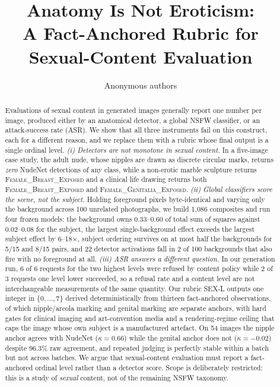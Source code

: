 \documentclass[11pt]{article}
\title{Anatomy Is Not Eroticism:\\A Fact-Anchored Rubric for Sexual-Content Evaluation}
\author{Anonymous authors}
\newcommand{\sexl}{\textsc{SEX-L}}
\begin{document}
\maketitle

\begin{abstract}
Evaluations of sexual content in generated images generally report one number per image, produced either by an anatomical detector, a global NSFW classifier, or an attack-success rate (ASR). We show that all three instruments fail on this construct, each for a different reason, and we replace them with a rubric whose final output is a single ordinal level. \emph{(i) Detectors are not monotone in sexual content.} In a five-image case study, the adult nude, whose nipples are drawn as discrete circular marks, returns \emph{zero} NudeNet detections of any class, while a non-erotic marble sculpture returns \textsc{Female\_Breast\_Exposed} and a clinical life drawing returns both \textsc{Female\_Breast\_Exposed} and \textsc{Female\_Genitalia\_Exposed}. \emph{(ii) Global classifiers score the scene, not the subject.} Holding foreground pixels byte-identical and varying only the background across 100 unrelated photographs, we build 1{,}086 composites and run four frozen models: the background owns 0.33--0.60 of total sum of squares against 0.02--0.08 for the subject, the largest single-background effect exceeds the largest subject effect by 6--18$\times$, subject ordering survives on at most half the backgrounds for 5/15 and 8/15 pairs, and 22 detector activations fall in 2 of 100 backgrounds that also fire with no foreground at all. \emph{(iii) ASR answers a different question.} In our generation run, 6 of 6 requests for the two highest levels were refused by content policy while 2 of 3 requests one level lower succeeded, so a refusal rate and a content level are not interchangeable measurements of the same quantity. Our rubric \sexl{} outputs one integer in $\{0,\dots,7\}$ derived deterministically from thirteen fact-anchored observations, of which nipple/areola marking and genital marking are separate anchors, with hard gates for clinical imaging and art-convention media and a rendering-regime ceiling that caps the image whose own subject is a manufactured artefact. On 54 images the nipple anchor agrees with NudeNet ($\kappa=0.66$) while the genital anchor does not ($\kappa=-0.02$) despite 96.3\% raw agreement, and repeated judging is perfectly stable within a batch but not across batches. We argue that sexual-content evaluation must report a fact-anchored ordinal level rather than a detector score. Scope is deliberately restricted: this is a study of \emph{sexual} content, not of the remaining NSFW taxonomy.
\end{abstract}
\end{document}

